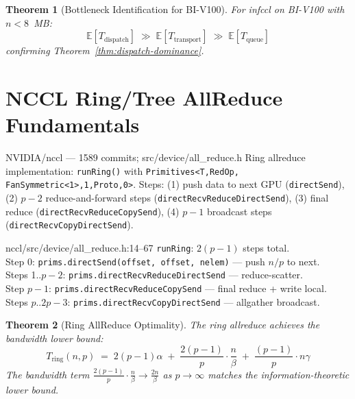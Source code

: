 \documentclass[11pt,a4paper,twoside]{article}
\theoremstyle{plain}
\newtheorem{theorem}{Theorem}[section]
\theoremstyle{definition}
\theoremstyle{remark}
\newcommand{\Expect}{\mathbb{E}}
\begin{document}
\begin{theorem}[Bottleneck Identification for BI-V100]
\label{thm:bottleneck}
For infccl on BI-V100 with $n < 8$~MB:
\begin{equation}
  \Expect[T_{\text{dispatch}}] \;\gg\; \Expect[T_{\text{transport}}]
  \;\gg\; \Expect[T_{\text{queue}}]
\end{equation}
confirming Theorem~\ref{thm:dispatch-dominance}.
\end{theorem}


\section{NCCL Ring/Tree AllReduce Fundamentals}
\label{sec:nccl}

\begin{commitbox}{NVIDIA/nccl --- 1589 commits; src/device/all\_reduce.h}
Ring allreduce implementation: \texttt{runRing()} with \texttt{Primitives<T,RedOp,
FanSymmetric<1>,1,Proto,0>}.  Steps: (1) push data to next GPU
(\texttt{directSend}), (2) $p-2$ reduce-and-forward steps
(\texttt{directRecvReduceDirectSend}), (3) final reduce
(\texttt{directRecvReduceCopySend}), (4) $p-1$ broadcast steps
(\texttt{directRecvCopyDirectSend}).
\end{commitbox}

\begin{codeline}{nccl/src/device/all\_reduce.h:14--67}
\texttt{runRing}: $2(p-1)$ steps total.\\
Step 0: \texttt{prims.directSend(offset, offset, nelem)} --- push $n/p$ to next.\\
Steps 1..$p{-}2$: \texttt{prims.directRecvReduceDirectSend} --- reduce-scatter.\\
Step $p{-}1$: \texttt{prims.directRecvReduceCopySend} --- final reduce + write local.\\
Steps $p$..$2p{-}3$: \texttt{prims.directRecvCopyDirectSend} --- allgather broadcast.
\end{codeline}

\begin{theorem}[Ring AllReduce Optimality]
\label{thm:ring-optimal}
The ring allreduce achieves the bandwidth lower bound:
\begin{equation}
  T_{\text{ring}}(n, p) \;=\; 2(p-1)\alpha \;+\;
  \frac{2(p-1)}{p} \cdot \frac{n}{\beta} \;+\;
  \frac{(p-1)}{p} \cdot n\gamma
\end{equation}
The bandwidth term $\frac{2(p-1)}{p} \cdot \frac{n}{\beta} \to \frac{2n}{\beta}$
as $p \to \infty$ matches the information-theoretic lower bound.
\end{theorem}
\end{document}

